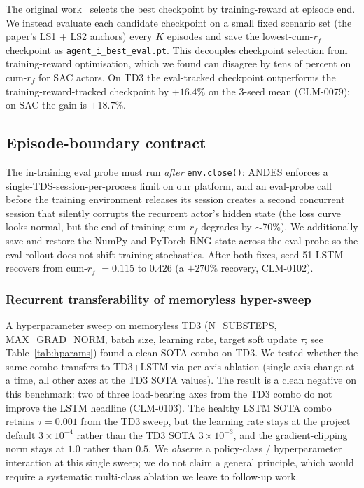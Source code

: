 \documentclass[journal,onecolumn,11pt]{IEEEtran}
\begin{document}
The original work~\cite[Sec.~IV-C]{yang2023ddic} selects the best
checkpoint by training-reward at episode end. We instead evaluate
each candidate checkpoint on a small fixed scenario set (the paper's
LS1 + LS2 anchors) every $K$ episodes and save the lowest-cum-$r_f$
checkpoint as \texttt{agent\_i\_best\_eval.pt}. This decouples
checkpoint selection from training-reward optimisation, which we
found can disagree by tens of percent on cum-$r_f$ for SAC actors.
On TD3 the eval-tracked checkpoint outperforms the
training-reward-tracked checkpoint by $+16.4\%$ on the 3-seed mean
(CLM-0079); on SAC the gain is $+18.7\%$.

\subsection{Episode-boundary contract}\label{sec:episode-boundary}

The in-training eval probe must run \emph{after} \texttt{env.close()}:
ANDES enforces a single-TDS-session-per-process limit on our
platform, and an eval-probe call before the training environment
releases its session creates a second concurrent session that
silently corrupts the recurrent actor's hidden state (the loss
curve looks normal, but the end-of-training cum-$r_f$ degrades by
$\sim$70\%). We additionally save and restore the NumPy and PyTorch
RNG state across the eval probe so the eval rollout does not shift
training stochastics. After both fixes, seed 51 LSTM recovers from
cum-$r_f$ $= 0.115$ to $0.426$ (a $+270\%$ recovery, CLM-0102).

\subsubsection*{Recurrent transferability of memoryless hyper-sweep}

A hyperparameter sweep on memoryless TD3
(N\_SUBSTEPS, MAX\_GRAD\_NORM, batch size, learning rate, target soft
update $\tau$; see Table~\ref{tab:hparams}) found a clean SOTA combo
on TD3. We tested whether the same combo transfers to TD3+LSTM via
per-axis ablation (single-axis change at a time, all other axes at
the TD3 SOTA values). The result is a clean negative on this
benchmark: two of three load-bearing axes from the TD3 combo do not
improve the LSTM headline (CLM-0103). The healthy LSTM SOTA combo
retains $\tau = 0.001$ from the TD3 sweep, but the learning rate
stays at the project default $3 \times 10^{-4}$ rather than the
TD3 SOTA $3 \times 10^{-3}$, and the gradient-clipping norm stays
at $1.0$ rather than $0.5$. We \emph{observe} a policy-class /
hyperparameter interaction at this single sweep; we do not claim a
general principle, which would require a systematic multi-class
ablation we leave to follow-up work.
\end{document}

